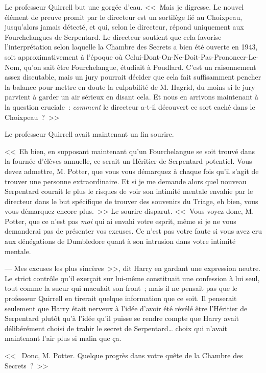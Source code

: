 Le professeur Quirrell but une gorgée d'eau. <<~Mais je digresse. Le nouvel élément de preuve promit par le directeur est un sortilège lié au Choixpeau, jusqu'alors jamais détecté, et qui, selon le directeur, répond uniquement aux Fourchelangues de Serpentard. Le directeur soutient que cela favorise l'interprétation selon laquelle la Chambre des Secrets a bien été ouverte en 1943, soit approximativement à l'époque où Celui-Dont-On-Ne-Doit-Pas-Prononcer-Le-Nom, qu'on sait être Fourchelangue, étudiait à Poudlard. C'est un raisonnement assez discutable, mais un jury pourrait décider que cela fait suffisamment pencher la balance pour mettre en doute la culpabilité de M. Hagrid, du moins si le jury parvient à garder un air sérieux en disant cela. Et nous en arrivons maintenant à la question cruciale~: \emph{comment} le directeur a-t-il découvert ce sort caché dans le Choixpeau~?~>>

Le professeur Quirrell avait maintenant un fin sourire.

<<~Eh bien, en supposant maintenant qu'un Fourchelangue se soit trouvé dans la fournée d'élèves annuelle, ce serait un Héritier de Serpentard potentiel. Vous devez admettre, M. Potter, que vous vous démarquez à chaque fois qu'il s'agit de trouver une personne extraordinaire. Et si je me demande alors quel nouveau Serpentard courait le plus le risques de voir son intimité mentale envahie par le directeur dans le but spécifique de trouver des souvenirs du Triage, eh bien, vous vous démarquez encore plus.~>> Le sourire disparut. <<~Vous voyez donc, M. Potter, que ce n'est pas \emph{moi} qui ai envahi votre esprit, même si je ne vous demanderai pas de présenter vos excuses. Ce n'est pas votre faute si vous avez cru aux dénégations de Dumbledore quant à son intrusion dans votre intimité mentale.

--- Mes excuses les plus sincères~>>, dit Harry en gardant une expression neutre. Le strict contrôle qu'il exerçait sur lui-même constituait une confession à lui seul, tout comme la sueur qui maculait son front~; mais il ne pensait pas que le professeur Quirrell en tirerait quelque information que ce soit. Il penserait seulement que Harry était nerveux à l'idée d'avoir été révélé être l'Héritier de Serpentard plutôt qu'à l'idée qu'il puisse se rendre compte que Harry avait délibérément choisi de trahir le secret de Serpentard… choix qui n'avait maintenant l'air plus si malin que ça.

<<~ Donc, M. Potter. Quelque progrès dans votre quête de la Chambre des Secrets~?~>>

